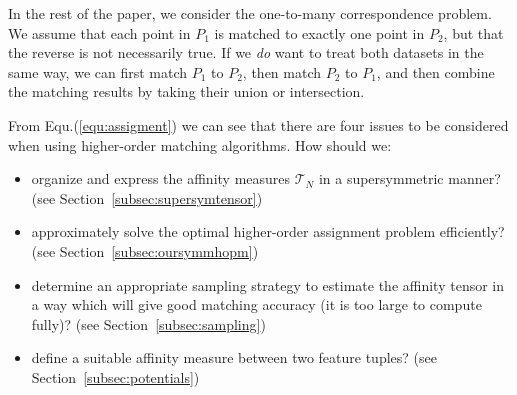 In the rest of the paper, we consider the one-to-many correspondence problem.
We assume that each point in $P_1$ is matched to exactly one point in $P_2$, but that the reverse is not necessarily true.
If we \emph{do} want to treat both datasets in the same way,
we can first match $P_1$ to $P_2$, then match $P_2$ to $P_1$, and then combine the matching results by taking their union or intersection.

From Equ.(\ref{equ:assigment}) we can see that there are four issues to be considered when using higher-order matching algorithms. How should we:
\begin{itemize}
\item organize and express the affinity measures $\mathcal{T}_N$ in a supersymmetric manner? (see Section~\ref{subsec:supersymtensor})
\item approximately solve the optimal higher-order assignment problem efficiently? (see Section~\ref{subsec:oursymmhopm})
\item determine an appropriate sampling strategy to estimate the affinity tensor in a way which will give good matching accuracy (it is too large to compute fully)? (see Section~\ref{subsec:sampling})
\item define a suitable affinity measure between two feature tuples? (see Section~\ref{subsec:potentials})\end{itemize}



